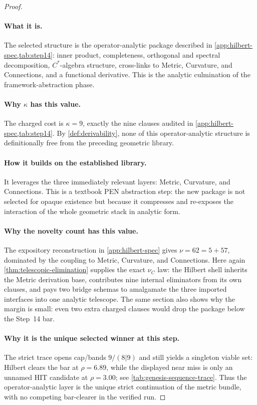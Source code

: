 \documentclass[11pt,a4paper]{article}
\theoremstyle{plain}
\theoremstyle{definition}
\theoremstyle{remark}
\begin{document}
\begin{proof}
\paragraph{What it is.}
The selected structure is the operator-analytic package described in
\cref{app:hilbert-spec,tab:step14}: inner product, completeness, orthogonal and
spectral decomposition, $C^*$-algebra structure, cross-links to Metric,
Curvature, and Connections, and a functional derivative.
This is the analytic culmination of the framework-abstraction phase.

\paragraph{Why $\kappa$ has this value.}
The charged cost is $\kappa=9$, exactly the nine clauses audited in
\cref{app:hilbert-spec,tab:step14}.
By \cref{def:derivability}, none of this operator-analytic structure is
definitionally free from the preceding geometric library.

\paragraph{How it builds on the established library.}
It leverages the three immediately relevant layers: Metric, Curvature, and
Connections.
This is a textbook PEN abstraction step: the new package is not selected for
opaque existence but because it compresses and re-exposes the interaction of the
whole geometric stack in analytic form.

\paragraph{Why the novelty count has this value.}
The expository reconstruction in \cref{app:hilbert-spec} gives
$\nu=62=5+57$, dominated by the coupling to Metric, Curvature, and Connections.
Here again \cref{thm:telescopic-elimination} supplies the exact $\nu_C$ law:
the Hilbert shell inherits the Metric derivation base, contributes nine internal
eliminators from its own clauses, and pays two bridge schemas to amalgamate the
three imported interfaces into one analytic telescope.
The same section also shows why the margin is small: even two extra charged
clauses would drop the package below the Step~14 bar.

\paragraph{Why it is the unique selected winner at this step.}
The strict trace opens cap/bands $9/(8|9)$ and still yields a singleton viable
set: Hilbert clears the bar at $\rho=6.89$, while the displayed near miss is
only an unnamed HIT candidate at $\rho=3.00$; see
\cref{tab:genesis-sequence-trace}.
Thus the operator-analytic layer is the unique strict continuation of the metric
bundle, with no competing bar-clearer in the verified run.
\end{proof}
\end{document}
